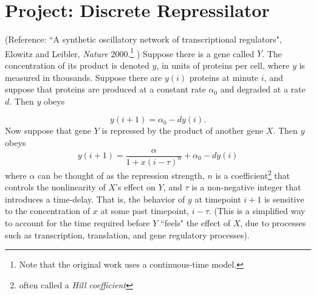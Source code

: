 \documentclass{exam}
\begin{document}
\section*{Project: Discrete Repressilator}
 
(Reference: ``A synthetic oscillatory network of transcriptional regulators", Elowitz and Leibler, \textit{Nature} 2000.\footnote{ Note that the original work uses a continuous-time model.} ) Suppose there is a gene called $Y$. The concentration of its product is denoted $y$, in units of proteins per cell, where $y$ is measured in thousands. Suppose there are $y(i)$ proteins at minute $i$, and suppose that proteins are produced at a constant rate $\alpha_0$ and degraded at a rate $d$. Then $y$ obeys

\begin{equation}
y(i+1) = \alpha_0 - dy(i).
\end{equation} 
Now suppose that gene $Y$ is repressed by the product of another gene $X$. Then $y$ obeys
\begin{equation}
y(i+1) = \frac{\alpha}{1 + x(i-\tau)^n} + \alpha_0 - dy(i)
\end{equation} 
where $\alpha$ can be thought of as the repression strength, $n$ is a coefficient\footnote{ often called a \textit{Hill coefficient}} that controls the nonlinearity of $X$'s effect on $Y$, and $\tau$ is a non-negative integer that introduces a time-delay. That is, the behavior of $y$ at timepoint $i+1$ is sensitive to the concentration of $x$ at some past timepoint, $i-\tau$. (This is a simplified way to account for the time required before $Y$ ``feels" the effect of $X$, due to processes such as transcription, translation, and gene regulatory processes). 
\end{document}
